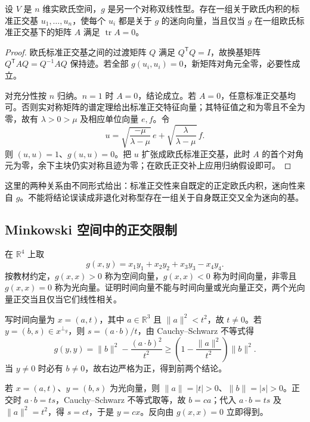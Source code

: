 \begin{theorem}
\label{thm:laex-isotropic-orthonormal}
设 $V$ 是 $n$ 维实欧氏空间，$g$ 是另一个对称双线性型。存在一组关于欧氏内积的标准正交基 $u_1,\ldots,u_n$，使每个 $u_i$ 都是关于 $g$ 的迷向向量，当且仅当 $g$ 在一组欧氏标准正交基下的矩阵 $A$ 满足 $\operatorname{tr}A=0$。
\end{theorem}
\begin{proof}
欧氏标准正交基之间的过渡矩阵 $Q$ 满足 $Q^{\mathsf T}Q=I$，故换基矩阵 $Q^{\mathsf T}AQ=Q^{-1}AQ$ 保持迹。若全部 $g(u_i,u_i)=0$，新矩阵对角元全零，必要性成立。

对充分性按 $n$ 归纳。$n=1$ 时 $A=0$，结论成立。若 $A=0$，任意标准正交基均可。否则实对称矩阵的谱定理给出标准正交特征向量；其特征值之和为零且不全为零，故有 $\lambda>0>\mu$ 及相应单位向量 $e,f$。令
\[
 u=\sqrt{\frac{-\mu}{\lambda-\mu}}\,e
   +\sqrt{\frac{\lambda}{\lambda-\mu}}\,f.
\]
则 $(u,u)=1$、$g(u,u)=0$。把 $u$ 扩张成欧氏标准正交基，此时 $A$ 的首个对角元为零，余下主块仍实对称且迹为零；在欧氏正交补上应用归纳假设即可。
\end{proof}

这里的两种关系由不同形式给出：标准正交性来自既定的正定欧氏内积，迷向性来自 $g$。不能将结论误读成非退化对称型存在一组关于自身既正交又全为迷向的基。

\subsection{Minkowski 空间中的正交限制}

\begin{example}
\label{ex:laex-minkowski}
在 $\mathbb R^4$ 上取
\[
 g(x,y)=x_1y_1+x_2y_2+x_3y_3-x_4y_4.
\]
按教材约定，$g(x,x)>0$ 称为空间向量，$g(x,x)<0$ 称为时间向量，非零且 $g(x,x)=0$ 称为光向量。证明时间向量不能与时间向量或光向量正交，两个光向量正交当且仅当它们线性相关。
\end{example}
\begin{solve}
写时间向量为 $x=(a,t)$，其中 $a\in\mathbb R^3$ 且 $\lVert a\rVert^2<t^2$，故 $t\ne0$。若 $y=(b,s)\in x^{\perp_g}$，则 $s=(a\cdot b)/t$，由 Cauchy--Schwarz 不等式得
\[
 g(y,y)=\lVert b\rVert^2-\frac{(a\cdot b)^2}{t^2}
 \ge\left(1-\frac{\lVert a\rVert^2}{t^2}\right)\lVert b\rVert^2.
\]
当 $y\ne0$ 时必有 $b\ne0$，故右边严格为正，得到前两个结论。

若 $x=(a,t)$、$y=(b,s)$ 为光向量，则 $\lVert a\rVert=|t|>0$、$\lVert b\rVert=|s|>0$。正交时 $a\cdot b=ts$，Cauchy--Schwarz 不等式取等，故 $b=ca$；代入 $a\cdot b=ts$ 及 $\lVert a\rVert^2=t^2$，得 $s=ct$，于是 $y=cx$。反向由 $g(x,x)=0$ 立即得到。
\end{solve}

